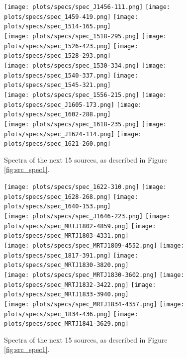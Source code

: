 \documentclass[preprint]{aastex}
\begin{document}
\begin{figure}\centering
\texttt{[image: plots/specs/spec\_J1456-111.png]}
\texttt{[image: plots/specs/spec\_1459-419.png]}
\texttt{[image: plots/specs/spec\_1514-165.png]}\\
\texttt{[image: plots/specs/spec\_1518-295.png]}
\texttt{[image: plots/specs/spec\_1526-423.png]}
\texttt{[image: plots/specs/spec\_1528-293.png]}\\
\texttt{[image: plots/specs/spec\_1530-334.png]}
\texttt{[image: plots/specs/spec\_1540-337.png]}
\texttt{[image: plots/specs/spec\_1545-321.png]}\\
\texttt{[image: plots/specs/spec\_1556-215.png]}
\texttt{[image: plots/specs/spec\_J1605-173.png]}
\texttt{[image: plots/specs/spec\_1602-288.png]}\\
\texttt{[image: plots/specs/spec\_1618-235.png]}
\texttt{[image: plots/specs/spec\_J1624-114.png]}
\texttt{[image: plots/specs/spec\_1621-260.png]}\\
\caption{Spectra of the next 15 sources, as described in Figure \ref{fig:src_spec1}.
}\label{fig:src_spec22}
\end{figure}\clearpage

\begin{figure}\centering
\texttt{[image: plots/specs/spec\_1622-310.png]}
\texttt{[image: plots/specs/spec\_1628-268.png]}
\texttt{[image: plots/specs/spec\_1640-153.png]}\\
\texttt{[image: plots/specs/spec\_J1646-223.png]}
\texttt{[image: plots/specs/spec\_MRTJ1802-4859.png]}
\texttt{[image: plots/specs/spec\_MRTJ1803-4331.png]}\\
\texttt{[image: plots/specs/spec\_MRTJ1809-4552.png]}
\texttt{[image: plots/specs/spec\_1817-391.png]}
\texttt{[image: plots/specs/spec\_MRTJ1830-3820.png]}\\
\texttt{[image: plots/specs/spec\_MRTJ1830-3602.png]}
\texttt{[image: plots/specs/spec\_MRTJ1832-3422.png]}
\texttt{[image: plots/specs/spec\_MRTJ1833-3940.png]}\\
\texttt{[image: plots/specs/spec\_MRTJ1834-4357.png]}
\texttt{[image: plots/specs/spec\_1834-436.png]}
\texttt{[image: plots/specs/spec\_MRTJ1841-3629.png]}\\
\caption{Spectra of the next 15 sources, as described in Figure \ref{fig:src_spec1}.
}\label{fig:src_spec23}
\end{figure}\clearpage
\end{document}
